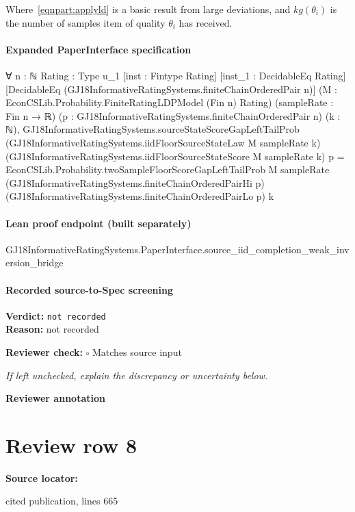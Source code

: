 \documentclass[10pt]{article}
\newcommand{\reviewerbox}{%
  \par\noindent\fbox{\parbox{0.96\linewidth}{\rule{0pt}{0.38in}}}\par
}
\newcommand{\reviewmatch}[1]{%
  \par\noindent\textbf{Reviewer check:} $\square$\; #1\par
  \noindent\emph{If left unchecked, explain the discrepancy or uncertainty below.}\par
}
\begin{document}
\begin{ReviewVerbatim}
Where~\eqref{eqnpart:applyld} is a basic result from large deviations, and $kg(\theta_i)$ is the number of samples item of quality $\theta_i$ has received. \Halmos
\end{ReviewVerbatim}


\paragraph{Expanded PaperInterface specification}
\begin{ReviewVerbatim}
∀ {n : ℕ} {Rating : Type u_1} [inst : Fintype Rating] [inst_1 : DecidableEq Rating]
  [DecidableEq (GJ18InformativeRatingSystems.finiteChainOrderedPair n)]
  (M : EconCSLib.Probability.FiniteRatingLDPModel (Fin n) Rating) (sampleRate : Fin n → ℝ)
  (p : GJ18InformativeRatingSystems.finiteChainOrderedPair n) (k : ℕ),
  GJ18InformativeRatingSystems.sourceStateScoreGapLeftTailProb
      (GJ18InformativeRatingSystems.iidFloorSourceStateLaw M sampleRate k)
      (GJ18InformativeRatingSystems.iidFloorSourceStateScore M sampleRate k) p =
    EconCSLib.Probability.twoSampleFloorScoreGapLeftTailProb M sampleRate
      (GJ18InformativeRatingSystems.finiteChainOrderedPairHi p)
      (GJ18InformativeRatingSystems.finiteChainOrderedPairLo p) k
\end{ReviewVerbatim}

\paragraph{Lean proof endpoint (built separately)}\begin{ReviewVerbatim}
GJ18InformativeRatingSystems.PaperInterface.source_iid_completion_weak_inversion_bridge
\end{ReviewVerbatim}

\paragraph{Recorded source-to-Spec screening}
\textbf{Verdict:} \texttt{not recorded}
\\
\textbf{Reason:} not recorded
\reviewmatch{Matches source input}
\noindent\textbf{Reviewer annotation}\par
\reviewerbox
\clearpage
\hypertarget{source-claim-75935d7eb4e2aa12}{}
\section*{Review row 8}
\textbf{Source locator:} {\footnotesize\raggedright cited publication, lines 665\par}
\end{document}
